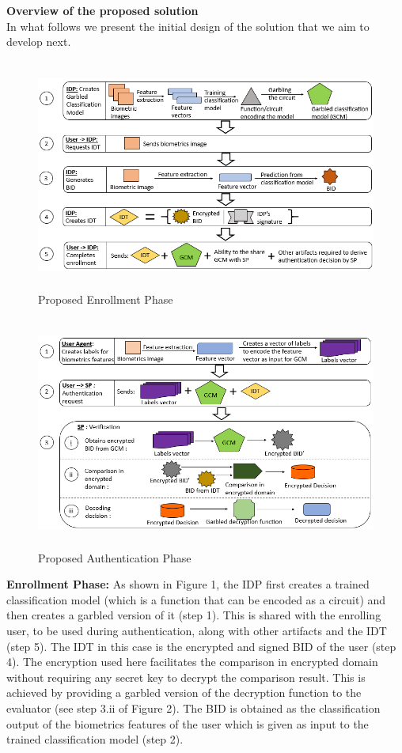 \documentclass[10pt]{article}
\begin{document}
\textbf{Overview of the proposed solution}\\
In what follows we present the initial design of the solution that we aim to develop next.\\
\begin{figure}[h]
\centering
\includegraphics[height=3.00in,width=5.00in]{enrollment}
\caption{Proposed Enrollment Phase}
\label{example}
\end{figure}
\begin{figure}[h]
\centering
\includegraphics[height=3.00in,width=5.00in]{authentication}
\caption{Proposed Authentication Phase}
\label{example}
\end{figure}

\textbf{Enrollment Phase:}
As shown in Figure 1, the IDP first creates a trained classification model (which is a function that can be encoded as a circuit) and then creates a 
garbled version of it (step 1). This is shared with the enrolling user, to be used during authentication, along with other artifacts and the IDT 
(step 5). The IDT in this case is the encrypted and signed BID of the user (step 4). The encryption used here facilitates the comparison in 
encrypted domain without requiring any secret key to decrypt the comparison result. This is achieved by providing a garbled version of the 
decryption function to the evaluator (see step 3.ii of Figure 2). The BID is obtained as the classification output of the biometrics features of the 
user which is given as input to the trained classification model (step 2).\\
\end{document}
